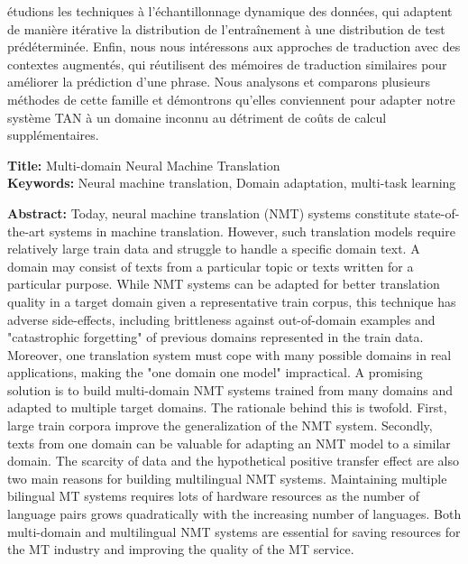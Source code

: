 \begin{mdframed}[linecolor=Prune,linewidth=1,nobreak=false]
\begin{multicols}{2}
étudions les techniques à l'échantillonnage dynamique des données, qui adaptent de manière itérative la distribution de l'entraînement à une distribution de test prédéterminée. Enfin, nous nous intéressons aux approches de traduction avec des contextes augmentés, qui réutilisent des mémoires de traduction similaires pour améliorer la prédiction d'une phrase. Nous analysons et comparons plusieurs méthodes de cette famille et démontrons qu'elles conviennent pour adapter notre système TAN à un domaine inconnu au détriment de coûts de calcul supplémentaires.
\end{multicols}
\end{mdframed}

\vspace{8mm}

\begin{mdframed}[linecolor=Prune,linewidth=1]
\footnotesize	
\onehalfspacing
\textbf{Title:} Multi-domain Neural Machine Translation\\
\noindent \textbf{Keywords:} Neural machine translation, Domain adaptation, multi-task learning
\begin{multicols}{2}
\noindent \textbf{Abstract:} Today, neural machine translation (NMT) systems constitute state-of-the-art systems in machine translation. However, such translation models require relatively large train data and struggle to handle a specific domain text. A domain may consist of texts from a particular topic or texts written for a particular purpose. While NMT systems can be adapted for better translation quality in a target domain given a representative train corpus, this technique has adverse side-effects, including brittleness against out-of-domain examples and "catastrophic forgetting" of previous domains represented in the train data. Moreover, one translation system must cope with many possible domains in real applications, making the "one domain one model" impractical. A promising solution is to build multi-domain NMT systems trained from many domains and adapted to multiple target domains. The rationale behind this is twofold. First, large train corpora improve the generalization of the NMT system. Secondly, texts from one domain can be valuable for adapting an NMT model to a similar domain. The scarcity of data and the hypothetical positive transfer effect are also two main reasons for building multilingual NMT systems. Maintaining multiple bilingual MT systems requires lots of hardware resources as the number of language pairs grows quadratically with the increasing number of languages. Both multi-domain and multilingual NMT systems are essential for saving resources for the MT industry and improving the quality of the MT service.


\end{multicols}
\end{mdframed}

